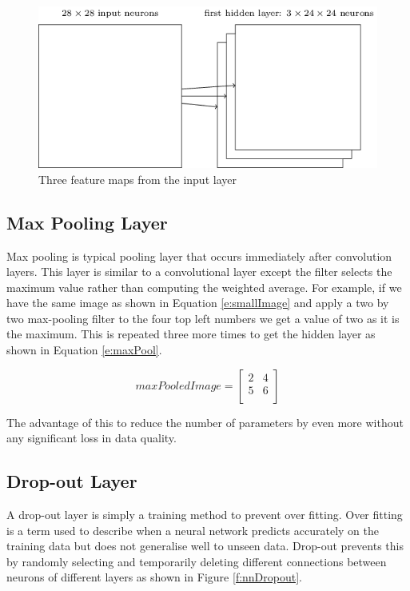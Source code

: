 \documentclass{bhamthesis}
\theoremstyle{definition}
\begin{document}
\begin{figure}
	\includegraphics[width=\textwidth]{media/img/cnn3FeatureMaps}
	\caption{Three feature maps from the input layer \cite{Neilsen2015}}\label{f:CNN3Feature}
\end{figure}


\subsection{Max Pooling Layer}
Max pooling is typical pooling layer that occurs immediately after convolution layers. This layer is similar to a convolutional layer except the filter selects the maximum value rather than computing the weighted average. For example, if we have the same image as shown in Equation \ref{e:smallImage} and apply a two by two max-pooling filter to the four top left numbers we get a value of two as it is the maximum. This is repeated three more times to get the hidden layer as shown in Equation \ref{e:maxPool}.

\begin{equation}\label{e:maxPool}
maxPooledImage=
\left[\begin{array}{cc}
2 & 4 \\
5 & 6 \\
\end{array}\right]
\end{equation}

The advantage of this to reduce the number of parameters by even more without any significant loss in data quality.
\subsection{Drop-out Layer}
A drop-out layer is simply a training method to prevent over fitting. Over fitting is a term used to describe when a neural network predicts accurately on the training data but does not generalise well to unseen data. Drop-out prevents this by randomly selecting and temporarily deleting different connections between neurons of different layers as shown in Figure \ref{f:nnDropout}.
\end{document}
